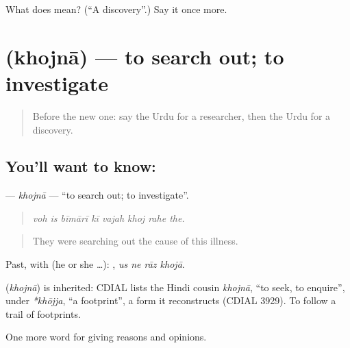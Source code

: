 \begin{tcolorbox}[breakable,colback=teal!4,colframe=teal!35!black,title={Before you move on}]
What does  mean? (\textquotedblleft{}A discovery\textquotedblright{}.) Say it once more.
\end{tcolorbox}
\section[\texorpdfstring{\ur{کھوجنا} (khojnā)}{کھوجنا (khojnā)}]{ (khojnā) — to search out; to investigate}

\label{lesson:UR-C349-khojna}



\begin{quote}
Before the new one: say the Urdu for a researcher, then the Urdu for a discovery.
\end{quote}

\subsection*{You'll want to know: }
\textbf{} — \emph{khojnā} — \textquotedblleft{}to search out; to investigate\textquotedblright{}.

\begin{quote}
       
\end{quote}

\begin{quote}
\emph{voh is bīmārī kī vajah khoj rahe the.}
\end{quote}

\begin{quote}
They were searching out the cause of this illness.
\end{quote}

Past, with  (he or she …):    , \emph{us ne rāz khojā}.

\begin{cousinweb}
\textbf{} (\emph{khojnā}) is inherited: CDIAL lists the Hindi cousin \emph{khojnā}, \textquotedblleft{}to seek, to enquire\textquotedblright{}, under \emph{*khōjja}, \textquotedblleft{}a footprint\textquotedblright{}, a form it reconstructs (CDIAL 3929). To follow a trail of footprints.
\end{cousinweb}

\begin{grammarlens}[title={What you've built}]
One more word for giving reasons and opinions.
\end{grammarlens}


